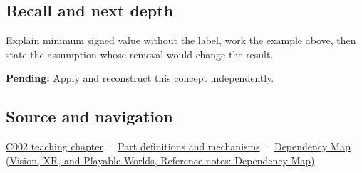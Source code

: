 \subsection{Recall and next depth}\label{appendix-05f39b10364d-recall-and-next-depth}

Explain minimum signed value without the label, work the example above, then state the assumption whose removal would change the result.

\textbf{Pending:} Apply and reconstruct this concept independently.

\subsection{Source and navigation}\label{appendix-05f39b10364d-source-and-navigation}

\hyperref[01-foundations-i-ch001-arithmetic-becomes-a-policy]{C002 teaching chapter} · \hyperref[appendix-fd090d982a15]{Part definitions and mechanisms} · \href{../07-Vision-XR-and-Playable-Worlds/main.pdf\#nameddest=appendix-4ad47bdd269a}{Dependency Map (Vision, XR, and Playable Worlds, Reference notes: Dependency Map)}
